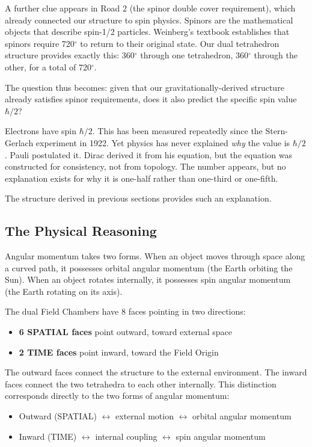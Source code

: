 \documentclass[aps,prd,preprint,superscriptaddress,showpacs,preprintnumbers,amsmath,amssymb,nofootinbib]{revtex4-2}
\begin{document}
A further clue appears in Road 2 (the spinor double cover requirement), which already connected our structure to spin physics. Spinors are the mathematical objects that describe spin-1/2 particles. Weinberg's textbook establishes that spinors require 720$^\circ$ to return to their original state. Our dual tetrahedron structure provides exactly this: 360$^\circ$ through one tetrahedron, 360$^\circ$ through the other, for a total of 720$^\circ$.

The question thus becomes: given that our gravitationally-derived structure already satisfies spinor requirements, does it also predict the specific spin value $\hbar/2$?

Electrons have spin $\hbar/2$. This has been measured repeatedly since the Stern-Gerlach experiment in 1922. Yet physics has never explained \emph{why} the value is $\hbar/2$. Pauli postulated it. Dirac derived it from his equation, but the equation was constructed for consistency, not from topology. The number appears, but no explanation exists for why it is one-half rather than one-third or one-fifth.

The structure derived in previous sections provides such an explanation.

\subsection{The Physical Reasoning}
\label{subsec:physical-reasoning}

Angular momentum takes two forms. When an object moves through space along a curved path, it possesses orbital angular momentum (the Earth orbiting the Sun). When an object rotates internally, it possesses spin angular momentum (the Earth rotating on its axis).

The dual Field Chambers have 8 faces pointing in two directions:
\begin{itemize}
\item \textbf{6 SPATIAL faces} point outward, toward external space
\item \textbf{2 TIME faces} point inward, toward the Field Origin
\end{itemize}

The outward faces connect the structure to the external environment. The inward faces connect the two tetrahedra to each other internally. This distinction corresponds directly to the two forms of angular momentum:
\begin{itemize}
\item Outward (SPATIAL) $\leftrightarrow$ external motion $\leftrightarrow$ orbital angular momentum
\item Inward (TIME) $\leftrightarrow$ internal coupling $\leftrightarrow$ spin angular momentum
\end{itemize}
\end{document}
